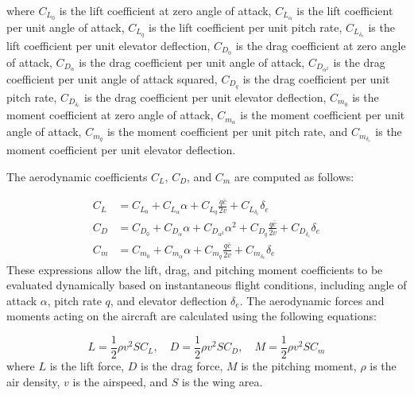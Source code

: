 \documentclass[journal,article,submit,pdftex,moreauthors]{Definitions/mdpi}
\begin{document}
where \(C_{L_0}\) is the lift coefficient at zero angle of attack, \(C_{L_\alpha}\) is the lift coefficient per unit angle of attack, \(C_{L_q}\) is the lift coefficient per unit pitch rate, \(C_{L_{\delta_e}}\) is the lift coefficient per unit elevator deflection, \(C_{D_0}\) is the drag coefficient at zero angle of attack, \(C_{D_\alpha}\) is the drag coefficient per unit angle of attack, \(C_{D_{\alpha^2}}\) is the drag coefficient per unit angle of attack squared, \(C_{D_q}\) is the drag coefficient per unit pitch rate, \(C_{D_{\delta_e}}\) is the drag coefficient per unit elevator deflection, \(C_{m_0}\) is the moment coefficient at zero angle of attack, \(C_{m_\alpha}\) is the moment coefficient per unit angle of attack, \(C_{m_q}\) is the moment coefficient per unit pitch rate, and \(C_{m_{\delta_e}}\) is the moment coefficient per unit elevator deflection.

The aerodynamic coefficients \(C_L\), \(C_D\), and \(C_m\) are computed as follows:

\begin{align}
    C_L &= C_{L_0} + C_{L_\alpha} \alpha + C_{L_q} \frac{q \bar{c}}{2v} + C_{L_{\delta_e}} \delta_e \\
    C_D &= C_{D_0} + C_{D_\alpha} \alpha + C_{D_{\alpha^2}} \alpha^2 + C_{D_q} \frac{q \bar{c}}{2v} + C_{D_{\delta_e}} \delta_e \\
    C_m &= C_{m_0} + C_{m_\alpha} \alpha + C_{m_q} \frac{q \bar{c}}{2v} + C_{m_{\delta_e}} \delta_e
\end{align}
These expressions allow the lift, drag, and pitching moment coefficients to be evaluated dynamically based on instantaneous flight conditions, including angle of attack \(\alpha\), pitch rate \(q\), and elevator deflection \(\delta_e\).
The aerodynamic forces and moments acting on the aircraft are calculated using the following equations:

\begin{equation}
    L = \frac{1}{2} \rho v^2 S C_L, \quad D = \frac{1}{2} \rho v^2 S C_D, \quad M = \frac{1}{2} \rho v^2 S C_m
\end{equation}
where \(L\) is the lift force, \(D\) is the drag force, \(M\) is the pitching moment, \(\rho\) is the air density, \(v\) is the airspeed, and \(S\) is the wing area.
\end{document}
